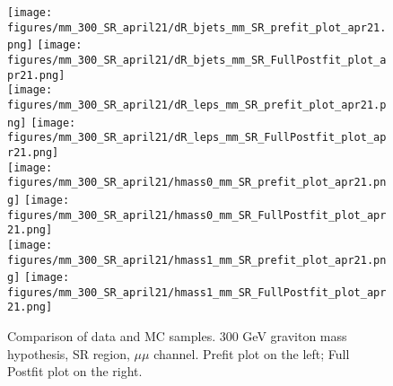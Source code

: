 \begin{figure}[H]
\begin{center}
\texttt{[image: figures/mm\_300\_SR\_april21/dR\_bjets\_mm\_SR\_prefit\_plot\_apr21.png]}
\texttt{[image: figures/mm\_300\_SR\_april21/dR\_bjets\_mm\_SR\_FullPostfit\_plot\_apr21.png]}\\
\texttt{[image: figures/mm\_300\_SR\_april21/dR\_leps\_mm\_SR\_prefit\_plot\_apr21.png]}
\texttt{[image: figures/mm\_300\_SR\_april21/dR\_leps\_mm\_SR\_FullPostfit\_plot\_apr21.png]}\\
\texttt{[image: figures/mm\_300\_SR\_april21/hmass0\_mm\_SR\_prefit\_plot\_apr21.png]}
\texttt{[image: figures/mm\_300\_SR\_april21/hmass0\_mm\_SR\_FullPostfit\_plot\_apr21.png]}\\
\texttt{[image: figures/mm\_300\_SR\_april21/hmass1\_mm\_SR\_prefit\_plot\_apr21.png]}
\texttt{[image: figures/mm\_300\_SR\_april21/hmass1\_mm\_SR\_FullPostfit\_plot\_apr21.png]}\\
\caption[Data-MC comparison in SR.]{Comparison of data and MC samples. 300 GeV graviton mass hypothesis, SR region, $\mu\mu$ channel. Prefit plot on the left; Full Postfit plot on the right.}
\label{MCcomparisons_mm_low_SR}
\end{center}
\end{figure}

